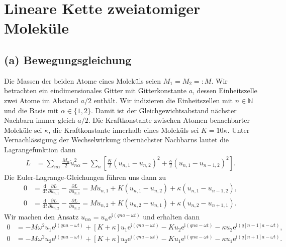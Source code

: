 \documentclass[english, parskip=full]{scrartcl}
\title{\titel}
\author{\autor}
\date{\today}
\newcommand{\kla}{}
\newcommand{\klam}{}
\newcommand{\tecxt}{}
\renewcommand{\i}{\text{i}}
\newcommand{\e}{\text{e}}
\begin{document}
\maketitle  %

\section{Lineare Kette zweiatomiger Moleküle}
\subsection*{(a) Bewegungsgleichung}
Die Massen der beiden Atome eines Moleküls seien $M_1 = M_2 =: M$.
Wir betrachten ein eindimensionales Gitter mit Gitterkonstante $a$, dessen Einheitszelle zwei Atome im Abstand $a/2$ enthält.
Wir indizieren die Einheitszellen mit $n\in\mathbb{N}$ und die Basis mit $\alpha\in\{1,2\}$.
Damit ist der Gleichgewichtsabstand nächster Nachbarn immer gleich $a/2$.
Die Kraftkonstante zwischen Atomen benachbarter Moleküle sei $\kappa$, die Kraftkonstante innerhalb eines Moleküls sei $K=10\kappa$.
Unter Vernachlässigung der Wechselwirkung  übernächster Nachbarns lautet die Lagrangefunktion dann
\begin{align}
L &= \sum_{n\alpha} \frac{M_\alpha}{2}\dot{u}_{n\alpha}^2 - \sum_n \klam\left[ \frac{K}{2}\kla\left( u_{n,1} - u_{n,2} \right)^2 + \frac{\kappa}{2}\kla\left( u_{n,1} - u_{n-1,2} \right)^2 \right].
\end{align}
Die Euler-Lagrange-Gleichungen führen uns dann zu
\begin{align}
0 &= \frac{\tecxt\text{d}}{\tecxt\text{d}t} \frac{\partial L}{\partial \dot{u}_{n,1}} - \frac{\partial L}{\partial u_{n,1}} = M\ddot{u}_{n,1} + K (u_{n,1} - u_{n,2}) + \kappa (u_{n,1} - u_{n-1,2}),\\
0 &= \frac{\tecxt\text{d}}{\tecxt\text{d}t} \frac{\partial L}{\partial \dot{u}_{n,2}} - \frac{\partial L}{\partial u_{n,2}} = M\ddot{u}_{n,2} + K (u_{n,2} - u_{n,1}) + \kappa (u_{n,2} - u_{n+1,1}).
\end{align}
Wir machen den Ansatz $u_{n\alpha} = u_\alpha \e^{\i(qna - \omega t)}$ und erhalten dann
\begin{align}
0 &= -M\omega^2u_1 \e^{\i(qna - \omega t)} + [K+\kappa] u_1 \e^{\i(qna - \omega t)} - Ku_2\e^{\i(qna - \omega t)} - \kappa u_2\e^{\i(q[n-1]a - \omega t)},\\
0 &= -M\omega^2u_2 \e^{\i(qna - \omega t)} + [K+\kappa] u_2 \e^{\i(qna - \omega t)} - Ku_1\e^{\i(qna - \omega t)} - \kappa u_1\e^{\i(q[n+1]a - \omega t)}.
\end{align}
\end{document}
